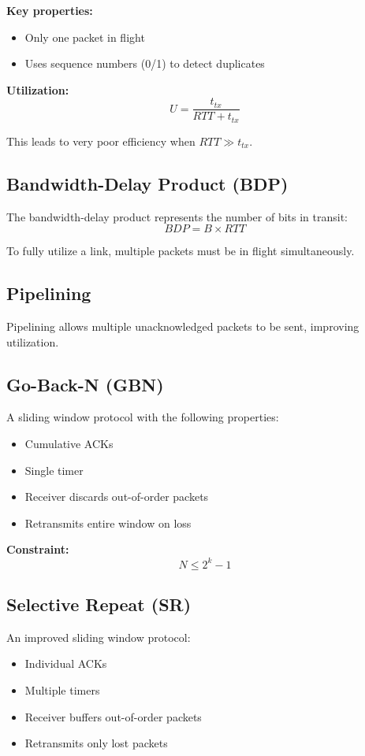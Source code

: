 \textbf{Key properties:}
\begin{itemize}
    \item Only one packet in flight
    \item Uses sequence numbers (0/1) to detect duplicates
\end{itemize}

\textbf{Utilization:}
\[
U = \frac{t_{tx}}{RTT + t_{tx}}
\]

This leads to very poor efficiency when $RTT \gg t_{tx}$.

\subsection{Bandwidth-Delay Product (BDP)}
The bandwidth-delay product represents the number of bits in transit:
\[
BDP = B \times RTT
\]

To fully utilize a link, multiple packets must be in flight simultaneously.

\subsection{Pipelining}
Pipelining allows multiple unacknowledged packets to be sent, improving utilization.

\subsection{Go-Back-N (GBN)}
A sliding window protocol with the following properties:
\begin{itemize}
    \item Cumulative ACKs
    \item Single timer
    \item Receiver discards out-of-order packets
    \item Retransmits entire window on loss
\end{itemize}

\textbf{Constraint:}
\[
N \leq 2^k - 1
\]

\subsection{Selective Repeat (SR)}
An improved sliding window protocol:
\begin{itemize}
    \item Individual ACKs
    \item Multiple timers
    \item Receiver buffers out-of-order packets
    \item Retransmits only lost packets
\end{itemize}

